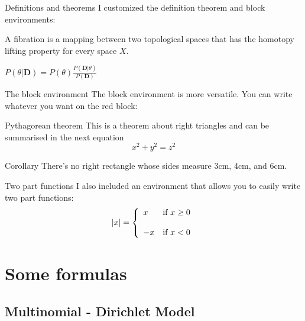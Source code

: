 \begin{frame}{Definitions and theorems}
	I customized the definition theorem and block environments:
	\begin{definition}[Fibration]
	A fibration is a mapping between two topological spaces that has the homotopy lifting property for every space $X$.
	\end{definition}
	\begin{theorem}[Bayes]
	$P(\theta|\textbf{D}) = P(\theta ) \frac{P(\textbf{D} |\theta)}{P(\textbf{D})}$
	\end{theorem}
\end{frame}

\begin{frame}{The block environment}
	The block environment is more versatile. You can write whatever you want on the red block:
	\begin{block}{Pythagorean theorem}
	This is a theorem about right triangles and can be summarised in the next 
	equation 
	\[ x^2 + y^2 = z^2 \]
	\end{block}
	\begin{block}{Corollary}
	There's no right rectangle whose sides measure 3cm, 4cm, and 6cm.
	\end{block}
\end{frame}

\begin{frame}{Two part functions}
	I also included an environment that allows you to easily write two part functions:
	$$|x| =\left\{ \begin{array}{ll} x & \mbox{if } x \geq 0 \\ \\ -x & \mbox{if } x < 0 \end{array} \right.$$
\end{frame}

\section{Some formulas}

\subsection{Multinomial - Dirichlet Model}

